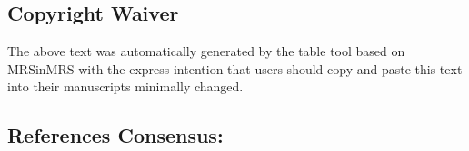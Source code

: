\documentclass{article}
\begin{document}
\subsection{Copyright Waiver}
The above text was automatically generated by the table tool based on MRSinMRS with the express intention that users should copy and paste this text into their manuscripts minimally changed.

\subsection{References Consensus:}
\nocite{*}
\printbibliography
\end{document}
